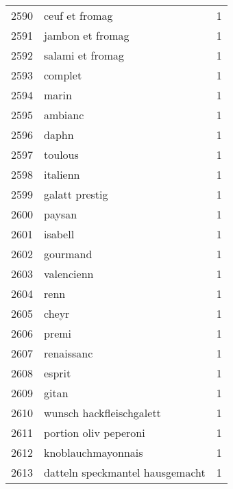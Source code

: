 \begin{tabular}{llr}
2590 &                                     ceuf et fromag &      1 \\
2591 &                                   jambon et fromag &      1 \\
2592 &                                   salami et fromag &      1 \\
2593 &                                            complet &      1 \\
2594 &                                              marin &      1 \\
2595 &                                            ambianc &      1 \\
2596 &                                              daphn &      1 \\
2597 &                                            toulous &      1 \\
2598 &                                           italienn &      1 \\
2599 &                                     galatt prestig &      1 \\
2600 &                                             paysan &      1 \\
2601 &                                            isabell &      1 \\
2602 &                                           gourmand &      1 \\
2603 &                                         valencienn &      1 \\
2604 &                                               renn &      1 \\
2605 &                                              cheyr &      1 \\
2606 &                                              premi &      1 \\
2607 &                                         renaissanc &      1 \\
2608 &                                             esprit &      1 \\
2609 &                                              gitan &      1 \\
2610 &                           wunsch hackfleischgalett &      1 \\
2611 &                              portion oliv peperoni &      1 \\
2612 &                                 knoblauchmayonnais &      1 \\
2613 &                    datteln speckmantel hausgemacht &      1 \\

\end{tabular}
